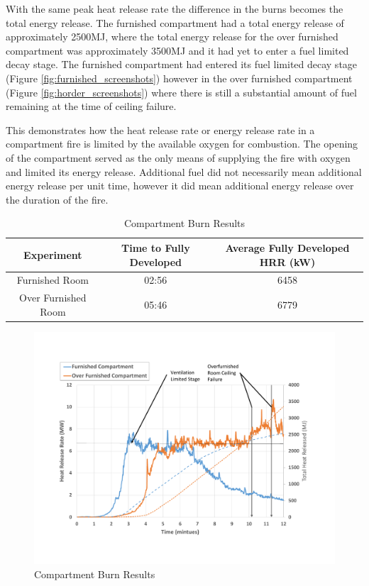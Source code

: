 \documentclass{article}
\begin{document}
With the same peak heat release rate the difference in the burns becomes the total energy release. The furnished compartment had a total energy release of approximately 2500MJ, where the total energy release for the over furnished compartment was approximately 3500MJ and it had yet to enter a fuel limited decay stage. The furnished compartment had entered its fuel limited decay stage (Figure \ref{fig:furnished_screenshots}) however in the over furnished compartment (Figure \ref{fig:horder_screenshots}) where there is still a substantial amount of fuel remaining at the time of ceiling failure. 

This demonstrates how the heat release rate or energy release rate in a compartment fire is limited by the available oxygen for combustion. The opening of the compartment served as the only means of supplying the fire with oxygen and limited its energy release. Additional fuel did not necessarily mean additional energy release per unit time, however it did mean additional energy release over the duration of the fire. 

\begin{table}[H]
	\caption{Compartment Burn Results}
	\begin{tabular}{|c|c|c|}
		\hline
		\textbf{Experiment} & \textbf{Time to Fully Developed} & \textbf{Average Fully Developed HRR (kW)} \\ \hline \hline
		Furnished Room & 02:56 & 6458 \\ \hline
		Over Furnished Room & 05:46 & 6779 \\ \hline
	\end{tabular}
	\label{table:comp_burn_results}
\end{table}

\begin{figure}[H]
	\centering
	\includegraphics[width=5in]{0_Images/Vent_Limited_Room/Compartment_Burn_Chart.pdf}
	\caption{Compartment Burn Results}
	\label{fig:comp_burn_chart}
\end{figure}
\end{document}
